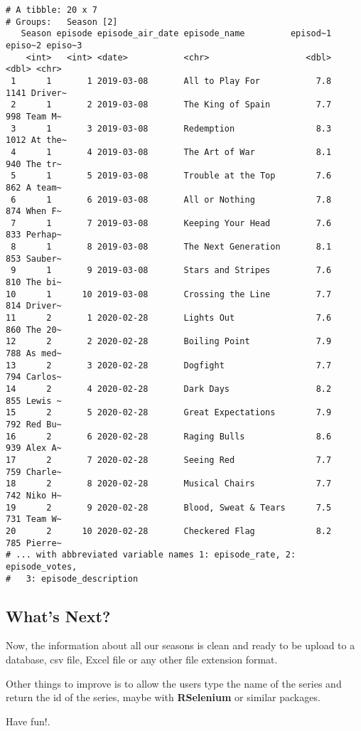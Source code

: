 \documentclass[
  letterpaper,
  DIV=11,
  numbers=noendperiod]{scrartcl}
\begin{document}
\begin{verbatim}
# A tibble: 20 x 7
# Groups:   Season [2]
   Season episode episode_air_date episode_name         episod~1 episo~2 episo~3
    <int>   <int> <date>           <chr>                   <dbl>   <dbl> <chr>  
 1      1       1 2019-03-08       All to Play For           7.8    1141 Driver~
 2      1       2 2019-03-08       The King of Spain         7.7     998 Team M~
 3      1       3 2019-03-08       Redemption                8.3    1012 At the~
 4      1       4 2019-03-08       The Art of War            8.1     940 The tr~
 5      1       5 2019-03-08       Trouble at the Top        7.6     862 A team~
 6      1       6 2019-03-08       All or Nothing            7.8     874 When F~
 7      1       7 2019-03-08       Keeping Your Head         7.6     833 Perhap~
 8      1       8 2019-03-08       The Next Generation       8.1     853 Sauber~
 9      1       9 2019-03-08       Stars and Stripes         7.6     810 The bi~
10      1      10 2019-03-08       Crossing the Line         7.7     814 Driver~
11      2       1 2020-02-28       Lights Out                7.6     860 The 20~
12      2       2 2020-02-28       Boiling Point             7.9     788 As med~
13      2       3 2020-02-28       Dogfight                  7.7     794 Carlos~
14      2       4 2020-02-28       Dark Days                 8.2     855 Lewis ~
15      2       5 2020-02-28       Great Expectations        7.9     792 Red Bu~
16      2       6 2020-02-28       Raging Bulls              8.6     939 Alex A~
17      2       7 2020-02-28       Seeing Red                7.7     759 Charle~
18      2       8 2020-02-28       Musical Chairs            7.7     742 Niko H~
19      2       9 2020-02-28       Blood, Sweat & Tears      7.5     731 Team W~
20      2      10 2020-02-28       Checkered Flag            8.2     785 Pierre~
# ... with abbreviated variable names 1: episode_rate, 2: episode_votes,
#   3: episode_description
\end{verbatim}

\hypertarget{whats-next}{%
\subsection{What's Next?}\label{whats-next}}

Now, the information about all our seasons is clean and ready to be
upload to a database, csv file, Excel file or any other file extension
format.

Other things to improve is to allow the users type the name of the
series and return the id of the series, maybe with \textbf{RSelenium} or
similar packages.

Have fun!.
\end{document}
